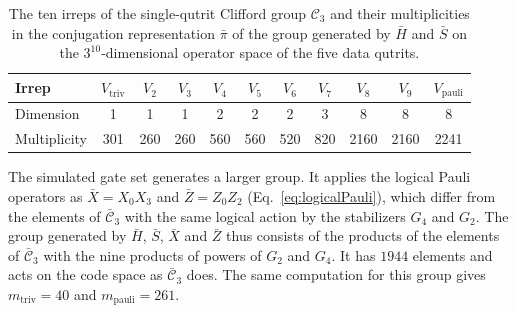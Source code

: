 \begin{table}[tb]
  \centering
  \begin{tabular}{l|cccccccccc}
    \hline
    Irrep & $V_{\mathrm{triv}}$ & $V_2$ & $V_3$ & $V_4$ & $V_5$ & $V_6$ & $V_7$ & $V_8$ & $V_9$ & $V_{\mathrm{pauli}}$ \\
    \hline
    Dimension & 1 & 1 & 1 & 2 & 2 & 2 & 3 & 8 & 8 & 8 \\
    Multiplicity & 301 & 260 & 260 & 560 & 560 & 520 & 820 & 2160 & 2160 & 2241 \\
    \hline
  \end{tabular}
  \caption{The ten irreps of the single-qutrit Clifford group $\mathcal{C}_3$ and their multiplicities in the conjugation representation $\bar\pi$ of the group generated by $\bar H$ and $\bar S$ on the $3^{10}$-dimensional operator space of the five data qutrits.}
  \label{tab:irreps}
\end{table}

The simulated gate set generates a larger group. It applies the logical Pauli operators as $\bar X = X_0 X_3$ and $\bar Z = Z_0 Z_2$ (Eq.~\eqref{eq:logicalPauli}), which differ from the elements of $\bar{\mathcal{C}}_3$ with the same logical action by the stabilizers $G_4$ and $G_2$. The group generated by $\bar H$, $\bar S$, $\bar X$ and $\bar Z$ thus consists of the products of the elements of $\bar{\mathcal{C}}_3$ with the nine products of powers of $G_2$ and $G_4$. It has $1944$ elements and acts on the code space as $\bar{\mathcal{C}}_3$ does. The same computation for this group gives $m_{\mathrm{triv}} = 40$ and $m_{\mathrm{pauli}} = 261$.

